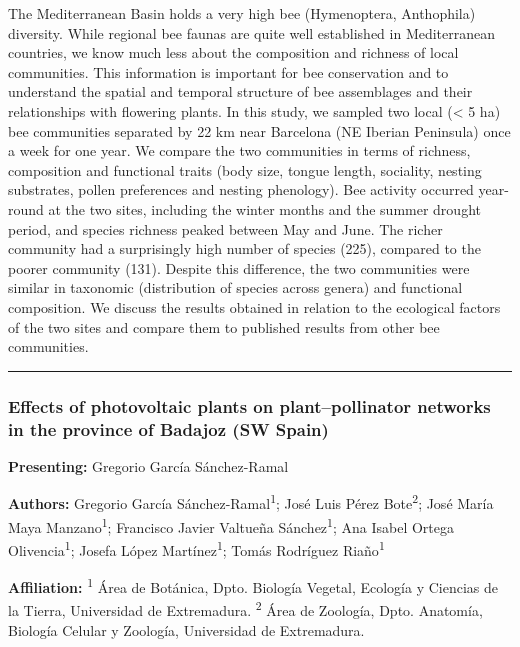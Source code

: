\documentclass[
  letterpaper,
  DIV=11,
  numbers=noendperiod]{scrartcl}
\begin{document}
The Mediterranean Basin holds a very high bee (Hymenoptera, Anthophila)
diversity. While regional bee faunas are quite well established in
Mediterranean countries, we know much less about the composition and
richness of local communities. This information is important for bee
conservation and to understand the spatial and temporal structure of bee
assemblages and their relationships with flowering plants. In this
study, we sampled two local (\textless{} 5 ha) bee communities separated
by 22 km near Barcelona (NE Iberian Peninsula) once a week for one year.
We compare the two communities in terms of richness, composition and
functional traits (body size, tongue length, sociality, nesting
substrates, pollen preferences and nesting phenology). Bee activity
occurred year-round at the two sites, including the winter months and
the summer drought period, and species richness peaked between May and
June. The richer community had a surprisingly high number of species
(225), compared to the poorer community (131). Despite this difference,
the two communities were similar in taxonomic (distribution of species
across genera) and functional composition. We discuss the results
obtained in relation to the ecological factors of the two sites and
compare them to published results from other bee communities.

\begin{center}\rule{0.5\linewidth}{0.5pt}\end{center}

\subsubsection{Effects of photovoltaic plants on plant--pollinator
networks in the province of Badajoz (SW
Spain)}\label{effects-of-photovoltaic-plants-on-plantpollinator-networks-in-the-province-of-badajoz-sw-spain}

\textbf{Presenting:} Gregorio García Sánchez-Ramal

\textbf{Authors:} Gregorio García Sánchez-Ramal\textsuperscript{1}; José
Luis Pérez Bote\textsuperscript{2}; José María Maya
Manzano\textsuperscript{1}; Francisco Javier Valtueña
Sánchez\textsuperscript{1}; Ana Isabel Ortega
Olivencia\textsuperscript{1}; Josefa López Martínez\textsuperscript{1};
Tomás Rodríguez Riaño\textsuperscript{1}

\textbf{Affiliation:} \textsuperscript{1} Área de Botánica, Dpto.
Biología Vegetal, Ecología y Ciencias de la Tierra, Universidad de
Extremadura. \textsuperscript{2} Área de Zoología, Dpto. Anatomía,
Biología Celular y Zoología, Universidad de Extremadura.
\end{document}

